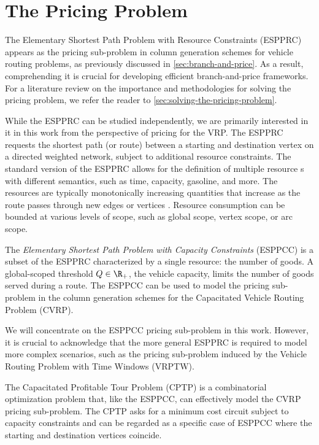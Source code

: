 \chapter{The Pricing Problem}
\label{sec:the-pricing-problem}

The Elementary Shortest Path Problem with Resource Constraints (ESPPRC)
appears as the pricing sub-problem in column generation schemes
for vehicle routing problems, as previously discussed in \cref{sec:branch-and-price}.
As a result, comprehending it is crucial for developing efficient branch-and-price frameworks.
For a literature review on the importance and methodologies
for solving the pricing problem,
we refer the reader to  \cref{sec:solving-the-pricing-problem}.

While the ESPPRC can be studied independently,
we are primarily interested in it in this work from the perspective of pricing for the VRP.
The ESPPRC requests the shortest path (or route)
between a starting and destination vertex on a directed weighted network,
subject to additional resource constraints.
The standard version of the ESPPRC allows for the definition of multiple resource
s with different semantics, such as time, capacity, gasoline, and more.
The resources are typically monotonically increasing quantities
that increase as the route passes through new edges or vertices \parencite{irnich2005, irnich2007resource}.
Resource consumption can be bounded at various levels of scope,
such as global scope, vertex scope, or arc scope.

The \textit{Elementary Shortest Path Problem with Capacity Constraints} (ESPPCC)
is a subset of the ESPPRC characterized by a single resource: the number of goods.
A global-scoped threshold $Q \in \R_{+}$, the vehicle capacity,
limits the number of goods served during a route.
The ESPPCC can be used to model the pricing sub-problem in the column
generation schemes for the Capacitated Vehicle Routing Problem (CVRP).

We will concentrate on the ESPPCC pricing sub-problem in this work.
However,
it is crucial to acknowledge that the more general ESPPRC is required to model more complex scenarios,
such as the pricing sub-problem induced by the Vehicle Routing Problem with Time Windows (VRPTW).

The Capacitated Profitable Tour Problem (CPTP)
is a combinatorial optimization problem that, like the ESPPCC,
can effectively model the CVRP pricing sub-problem.
The CPTP asks for a minimum cost circuit subject to capacity constraints
and can be regarded as a specific case of ESPPCC where the starting
and destination vertices coincide.

